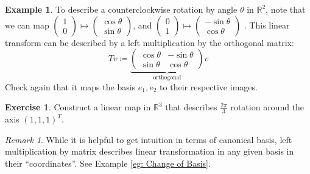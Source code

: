 \documentclass[12pt, a4paper]{article}
\newcommand{\R}{\mathbb{R}}
\theoremstyle{remark}
\newtheorem{remark}{Remark}
\theoremstyle{definition}
\newtheorem{example}{Example}
\newtheorem{exercise}{Exercise}
\numberwithin{equation}{section}
\numberwithin{definition}{section}
\numberwithin{example}{section}
\numberwithin{exercise}{section}
\numberwithin{remark}{section}
\numberwithin{figure}{section}
\begin{document}
\begin{example}
    To describe a counterclockwise rotation by angle $\theta$ in $\R^2$,
    note that we can map 
    $
    \begin{pmatrix}
        1 \\ 0
    \end{pmatrix}
    \mapsto
    \begin{pmatrix}
        \cos \theta \\ \sin\theta
    \end{pmatrix}
    $,
    and
    $
    \begin{pmatrix}
        0 \\ 1
    \end{pmatrix}
    \mapsto
    \begin{pmatrix}
        -\sin\theta \\ \cos\theta
    \end{pmatrix}
    $
    .
    This linear transform can be described by a left multiplication by the orthogonal matrix:
    \begin{equation*}
        Tv \coloneqq
        \underbrace{
        \begin{pmatrix}
            \cos \theta & -\sin \theta \\
            \sin \theta & \cos \theta
        \end{pmatrix}
    }_{\text{orthogonal}}
        v
    \end{equation*}
    Check again that it maps the basis $e_1, e_2$ to their respective images.
\end{example}
\begin{exercise}
    Construct a linear map in $\R^3$ that describes $\frac{2\pi}{3}$ rotation around the axis $\left( 1,1,1 \right)^T$.
\end{exercise}
\begin{remark}
    While it is helpful to get intuition in terms of canonical basis,
    left multiplication by matrix describes linear transformation in any given basis in their ``coordinates''.
    See Example \ref{eg: Change of Basis}.
\end{remark}
\end{document}
